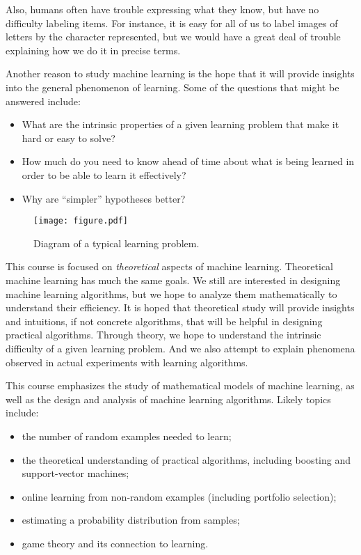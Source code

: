 \documentclass[11pt]{article}
\begin{document}
Also, humans often have trouble expressing what they know, but have no
difficulty labeling items.
For instance, it is easy for all of us to label images of letters by
the character
represented, but we would have a great deal of trouble explaining how
we do it in precise terms.

Another reason to study machine learning is the hope that it will
provide insights into the general phenomenon of learning.
Some of the questions that might be answered include:
\begin{itemize}
\item
What are the intrinsic properties of a given learning problem that
make it hard or easy to solve?
\item
How much do you need to know ahead of time about what is being learned
in order to be able to learn it effectively?
\item
Why are ``simpler'' hypotheses better?
\end{itemize}

\begin{figure}[t]
\begin{center}
\texttt{[image: figure.pdf]}
\end{center}
\caption{Diagram of a typical learning problem.}
\label{fig:ml}
\end{figure}

This course is focused on {\em theoretical} aspects of machine
learning.
Theoretical machine learning has much the same goals.
We still are interested in designing machine learning algorithms, but
we hope to analyze them mathematically to understand their efficiency.
It is hoped that theoretical study will provide insights and
intuitions, if not concrete algorithms, that will be helpful in
designing practical algorithms.
Through theory, we hope to understand the intrinsic difficulty of a
given learning problem.
And we also attempt to explain phenomena observed in actual experiments
with learning algorithms.

This course emphasizes the study of mathematical models of machine
learning, as well as the design and analysis of machine learning
algorithms.
Likely topics include:
\begin{itemize}
\item
the number of random examples needed to learn;
\item
the theoretical understanding of practical algorithms, including
boosting and support-vector machines;
\item
online learning from non-random examples (including portfolio selection);
\item
estimating a probability distribution from samples;
\item
game theory and its connection to learning.
\end{itemize}
\end{document}
